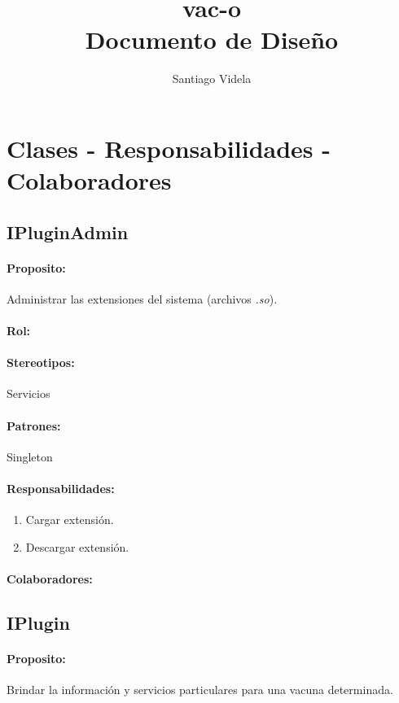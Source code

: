 \documentclass[a4paper,10pt]{article}
\author{Santiago Videla}
\title{vac-o\\ Documento de Dise\~no}
\begin{document}
\maketitle
\newpage
\tableofcontents
\newpage

\section{Clases - Responsabilidades - Colaboradores}
  \subsection{IPluginAdmin}
    \paragraph{Proposito:} Administrar las extensiones del sistema (archivos
\textit{.so}).
    \paragraph{Rol:}
    \paragraph{Stereotipos:} Servicios
    \paragraph{Patrones:} Singleton
    \paragraph{Responsabilidades:}
      \begin{enumerate}
       \item Cargar extensi\'on.
       \item Descargar extensi\'on.
      \end{enumerate}
    \paragraph{Colaboradores:}  

  \subsection{IPlugin}
    \paragraph{Proposito:} Brindar la informaci\'on y servicios particulares
para una vacuna determinada.
\end{document}
